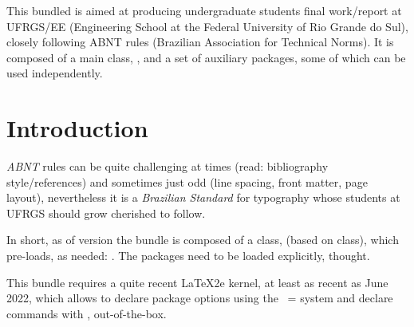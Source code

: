 \documentclass[article,nofontwarning,nogeometry,english,tocdepth=3,secdepth=3]{ufrgscca} %
\newif\iffulldoc
\newif\ifversiontest
\begin{document}
\iffulldoc
\tstitle{
  author={Alceu Frigeri\footnote{\tsfmt{\url{https://github.com/alceu-frigeri/ufrgscca}}} },
  date={\monthname\space\number\year},
  title={The ufrgscca, and associated, Packages\\ Version \PkgInfo{ufrgscca}{version} \\(extended documentation)}
  }
\else
{}
\fi

\ifversiontest
\ExplSyntaxOn
\clist_map_inline:nn {ufrgscca,ufrgscca-abnt,ufrgscca-core,ufrgscca-cover,ufrgscca-lists,ufrgscca-forms,ufrgscca-coord,ufrgscca-curr,ufrgscca-ppc}{\PkgInfoDescription{#1}}
\ExplSyntaxOff
\fi

	\begin{tsabstract}
		This bundled is aimed at producing undergraduate students final work/report at UFRGS/EE (Engineering School at the Federal University of Rio Grande do Sul), closely following ABNT rules (Brazilian Association for Technical Norms). It is composed of a main class, , and a set of auxiliary packages, some of which can be used independently.

	\end{tsabstract}

\tableofcontents

	\section{Introduction}
	\emph{ABNT} rules can be quite challenging at times (read: bibliography style/references) and sometimes just odd (line spacing, front matter, page layout), nevertheless it is a \emph{Brazilian Standard} for typography whose students at UFRGS should grow cherished to follow.

	In short, as of version \space the bundle is composed of a class,  (based on  class), which pre-loads, as needed: . The packages  need to be loaded explicitly, thought.

\begin{tsremark}[N.B.:]
	This bundle requires a quite recent \LaTeX2e kernel, at least as recent as June 2022, which allows to declare package options using the ~= system and declare commands with \tsmacro{\NewDocumentCommand}{}, out-of-the-box.
\end{tsremark}
\end{document}

